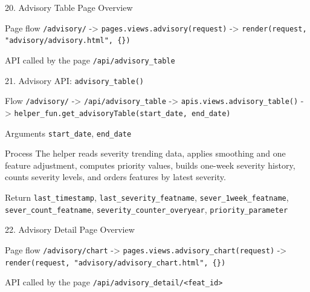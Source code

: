 \documentclass[aspectratio=169]{beamer}
\begin{document}
\begin{frame}{20. Advisory Table Page Overview}
\justifying
\begin{block}{Page flow}
\texttt{/advisory/} -> \texttt{pages.views.advisory(request)} ->
\texttt{render(request, "advisory/advisory.html", \{\})}
\end{block}

\begin{block}{API called by the page}
\texttt{/api/advisory\_table}
\end{block}
\end{frame}

\begin{frame}{21. Advisory API: \texttt{advisory\_table()}}
\justifying
\begin{block}{Flow}
\texttt{/advisory/} -> \texttt{/api/advisory\_table} ->
\texttt{apis.views.advisory\_table()} ->
\texttt{helper\_fun.get\_advisoryTable(start\_date, end\_date)}
\end{block}

\begin{block}{Arguments}
\texttt{start\_date}, \texttt{end\_date}
\end{block}

\begin{block}{Process}
The helper reads severity trending data, applies smoothing and one feature adjustment, computes priority values, builds one-week severity history, counts severity levels, and orders features by latest severity.
\end{block}

\begin{block}{Return}
\small
\texttt{last\_timestamp}, \texttt{last\_severity\_featname}, \texttt{sever\_1week\_featname}, \texttt{sever\_count\_featname}, \texttt{severity\_counter\_overyear}, \texttt{priority\_parameter}
\end{block}
\end{frame}

\begin{frame}{22. Advisory Detail Page Overview}
\justifying
\begin{block}{Page flow}
\texttt{/advisory/chart} -> \texttt{pages.views.advisory\_chart(request)} ->
\texttt{render(request, "advisory/advisory\_chart.html", \{\})}
\end{block}

\begin{block}{API called by the page}
\texttt{/api/advisory\_detail/<feat\_id>}
\end{block}
\end{frame}
\end{document}
